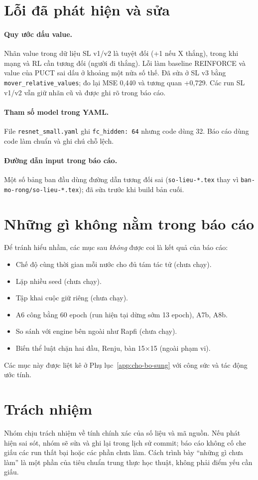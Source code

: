 \section{Lỗi đã phát hiện và sửa}
\paragraph{Quy ước dấu value.} Nhãn value trong dữ liệu SL v1/v2 là tuyệt đối (+1 nếu X thắng),
trong khi mạng và RL cần tương đối (người đi thắng). Lỗi làm baseline REINFORCE và value của
PUCT sai dấu ở khoảng một nửa số thế. Đã sửa ở SL v3 bằng \texttt{mover\_relative\_values}; đo
lại MSE 0,440 và tương quan +0,729. Các run SL v1/v2 vẫn giữ nhãn cũ và được ghi rõ trong báo
cáo.

\paragraph{Tham số model trong YAML.} File \texttt{resnet\_small.yaml} ghi \texttt{fc\_hidden:
64} nhưng code dùng 32. Báo cáo dùng code làm chuẩn và ghi chú chỗ lệch.

\paragraph{Đường dẫn input trong báo cáo.} Một số bảng ban đầu dùng đường dẫn tương đối sai
(\texttt{so-lieu-*.tex} thay vì \texttt{ban-mo-rong/so-lieu-*.tex}); đã sửa trước khi build
bản cuối.

\section{Những gì không nằm trong báo cáo}
Để tránh hiểu nhầm, các mục sau \emph{không} được coi là kết quả của báo cáo:
\begin{itemize}
  \item Chế độ cùng thời gian mỗi nước cho đủ tám tác tử (chưa chạy).
  \item Lặp nhiều seed (chưa chạy).
  \item Tập khai cuộc giữ riêng (chưa chạy).
  \item A6 công bằng 60 epoch (run hiện tại dừng sớm 13 epoch), A7b, A8b.
  \item So sánh với engine bên ngoài như Rapfi (chưa chạy).
  \item Biến thể luật chặn hai đầu, Renju, bàn 15×15 (ngoài phạm vi).
\end{itemize}
Các mục này được liệt kê ở Phụ lục~\ref{app:cho-bo-sung} với công sức và tác động ước tính.

\section{Trách nhiệm}
Nhóm chịu trách nhiệm về tính chính xác của số liệu và mã nguồn. Nếu phát hiện sai sót, nhóm
sẽ sửa và ghi lại trong lịch sử commit; báo cáo không cố che giấu các run thất bại hoặc các
phần chưa làm. Cách trình bày ``những gì chưa làm'' là một phần của tiêu chuẩn trung thực học
thuật, không phải điểm yếu cần giấu.